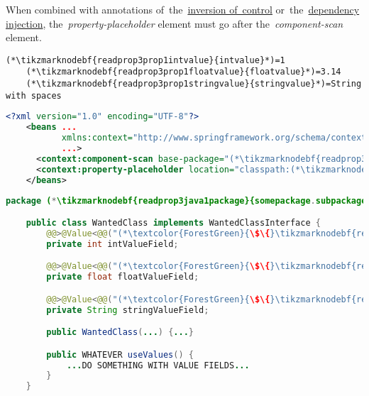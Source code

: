 \warning When combined with annotations of~the~\hyperref[iocannotations]{inversion of~control} or~the~\hyperref[autowiring]{dependency injection}, the~\textit{property-placeholder} element must go after the~\textit{component-scan} element.

\enlargethispage{20mm}
\thispagestyle{empty}
\example
\begin{lstlisting}[title={A \mboxtextit{.properties} file called \tikzmarknodebf{readprop3prop1filename}{\textit{annotations.properties}}}]
    (*\tikzmarknodebf{readprop3prop1intvalue}{intvalue}*)=1
    (*\tikzmarknodebf{readprop3prop1floatvalue}{floatvalue}*)=3.14
    (*\tikzmarknodebf{readprop3prop1stringvalue}{stringvalue}*)=String with spaces
\end{lstlisting}
\begin{lstlisting}[language=XML, title={Configuration XML}]
    <?xml version="1.0" encoding="UTF-8"?>
    <beans ...
           xmlns:context="http://www.springframework.org/schema/context"
           ...>
      <context:component-scan base-package="(*\tikzmarknodebf{readprop3xml1package}{somepackage.subpackage}[ForestGreen]*)"/>
      <context:property-placeholder location="classpath:(*\tikzmarknodebf{readprop3xml1filename}{annotations.properties}[ForestGreen]*)" file-encoding="utf-8"/>
    </beans>
\end{lstlisting}
\begin{lstlisting}[language=Java, title={Wanted class with any constructor}]
    package (*\tikzmarknodebf{readprop3java1package}{somepackage.subpackage}*);

    public class WantedClass implements WantedClassInterface {
        @@>@Value<@@("(*\textcolor{ForestGreen}{\$\{}\tikzmarknodebf{readprop3java1intvalue}{intvalue}[ForestGreen]\textcolor{ForestGreen}{\}}*)")
        private int intValueField;

        @@>@Value<@@("(*\textcolor{ForestGreen}{\$\{}\tikzmarknodebf{readprop3java1floatvalue}{floatvalue}[ForestGreen]\textcolor{ForestGreen}{\}}*)")
        private float floatValueField;

        @@>@Value<@@("(*\textcolor{ForestGreen}{\$\{}\tikzmarknodebf{readprop3java1stringvalue}{stringvalue}[ForestGreen]\textcolor{ForestGreen}{\}}*)")
        private String stringValueField;

        public WantedClass(...) {...}

        public WHATEVER useValues() {
            ...DO SOMETHING WITH VALUE FIELDS...
        }
    }
\end{lstlisting}
\newpage

